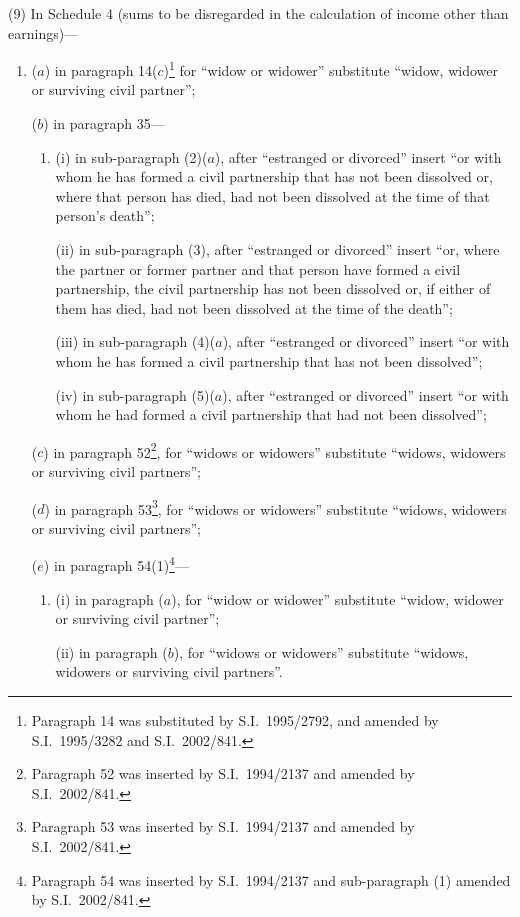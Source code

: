 \documentclass[12pt,a4paper]{article}
\begin{document}
(9) In Schedule 4 (sums to be disregarded in the calculation of income other than earnings)—
\begin{enumerate}\item[]
($a$) in paragraph 14($c$)\footnote{Paragraph 14 was substituted by S.I.\ 1995/2792, and amended by S.I.\ 1995/3282 and S.I.\ 2002/841.} for “widow or widower” substitute “widow, widower or surviving civil partner”;

($b$) in paragraph 35—
\begin{enumerate}\item[]
(i) in sub-paragraph (2)($a$), after “estranged or divorced” insert “or with whom he has formed a civil partnership that has not been dissolved or, where that person has died, had not been dissolved at the time of that person’s death”;

(ii) in sub-paragraph (3), after “estranged or divorced” insert “or, where the partner or former partner and that person have formed a civil partnership, the civil partnership has not been dissolved or, if either of them has died, had not been dissolved at the time of the death”;

(iii) in sub-paragraph (4)($a$), after “estranged or divorced” insert “or with whom he has formed a civil partnership that has not been dissolved”;

(iv) in sub-paragraph (5)($a$), after “estranged or divorced” insert “or with whom he had formed a civil partnership that had not been dissolved”;
\end{enumerate}

($c$) in paragraph 52\footnote{Paragraph 52 was inserted by S.I.\ 1994/2137 and amended by S.I.\ 2002/841.}, for “widows or widowers” substitute “widows, widowers or surviving civil partners”;

($d$) in paragraph 53\footnote{Paragraph 53 was inserted by S.I.\ 1994/2137 and amended by S.I.\ 2002/841.}, for “widows or widowers” substitute “widows, widowers or surviving civil partners”;

($e$) in paragraph 54(1)\footnote{Paragraph 54 was inserted by S.I.\ 1994/2137 and sub-paragraph (1) amended by S.I.\ 2002/841. }—
\begin{enumerate}\item[]
(i) in paragraph ($a$), for “widow or widower” substitute “widow, widower or surviving civil partner”;

(ii) in paragraph ($b$), for “widows or widowers” substitute “widows, widowers or surviving civil partners”.
\end{enumerate}
\end{enumerate}
\end{document}
